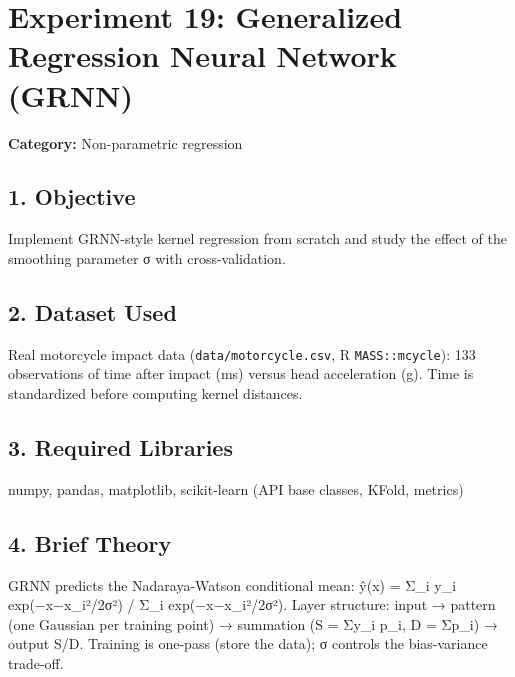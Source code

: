 
\chapter{Experiment 19: Generalized Regression Neural Network
(GRNN)}\label{experiment-19-generalized-regression-neural-network-grnn}

\textbf{Category:} Non-parametric regression

\section{1. Objective}\label{objective}

Implement GRNN-style kernel regression from scratch and study the effect
of the smoothing parameter σ with cross-validation.

\section{2. Dataset Used}\label{dataset-used}

Real motorcycle impact data
(\passthrough{\lstinline!data/motorcycle.csv!}, R
\passthrough{\lstinline!MASS::mcycle!}): 133 observations of time after
impact (ms) versus head acceleration (g). Time is standardized before
computing kernel distances.

\section{3. Required Libraries}\label{required-libraries}

numpy, pandas, matplotlib, scikit-learn (API base classes, KFold,
metrics)

\section{4. Brief Theory}\label{brief-theory}

GRNN predicts the Nadaraya-Watson conditional mean: ŷ(x) = Σ\_i y\_i
exp(−\textbar\textbar x−x\_i\textbar\textbar²/2σ²) / Σ\_i
exp(−\textbar\textbar x−x\_i\textbar\textbar²/2σ²). Layer structure:
input → pattern (one Gaussian per training point) → summation (S = Σy\_i
p\_i, D = Σp\_i) → output S/D. Training is one-pass (store the data); σ
controls the bias-variance trade-off.

